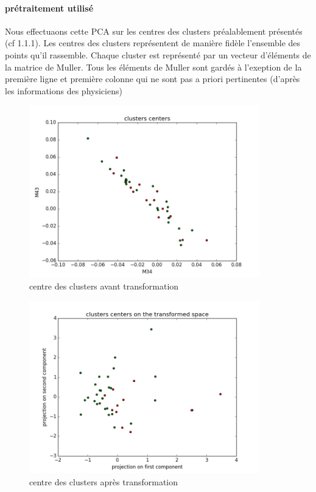\documentclass[a4paper,10pt]{report}
\begin{document}
\paragraph{prétraitement utilisé}
Nous effectuaons cette PCA sur les centres des clusters préalablement présentés (cf 1.1.1). Les centres des clusters représentent de manière fidèle l'ensemble des points qu'il rassemble. Chaque cluster est représenté par un vecteur d'éléments de la matrice de Muller. Tous les éléments de Muller sont gardés à l'exeption de la première ligne et première colonne qui ne sont pas a priori pertinentes (d'après les informations des physiciens)
\begin{figure}
  \caption{centre des clusters avant transformation}
  \centering
  \includegraphics[width=10cm]{PCA_0.png}
\end{figure}
\begin{figure}
  \caption{centre des clusters après transformation}
  \centering
  \includegraphics[width=10cm]{PCA_1.png}
\end{figure}
\end{document}
